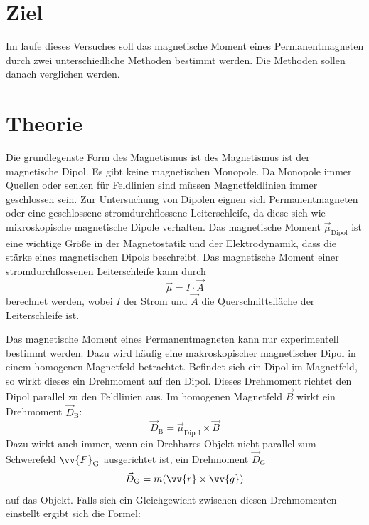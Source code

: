 \section{Ziel}
\label{sec:Ziel}
Im laufe dieses Versuches soll das magnetische Moment eines Permanentmagneten durch zwei unterschiedliche Methoden bestimmt werden. Die Methoden sollen danach verglichen werden.

\section{Theorie}
\label{sec:Theorie}
Die grundlegenste Form des Magnetismus ist des Magnetismus ist der magnetische Dipol. Es gibt keine magnetischen Monopole. Da Monopole immer Quellen oder senken für Feldlinien sind
müssen Magnetfeldlinien immer geschlossen sein. Zur Untersuchung von Dipolen eignen sich Permanentmagneten oder eine geschlossene stromdurchflossene Leiterschleife, da diese sich 
wie mikroskopische magnetische Dipole verhalten. Das magnetische Moment $\vec{\mu}_{\text{Dipol}}$ ist eine wichtige Größe in der Magnetostatik und der Elektrodynamik, dass die stärke eines 
magnetischen Dipols beschreibt. Das magnetische Moment einer stromdurchflossenen Leiterschleife kann durch 
\begin{equation}
\label{eqn:mu Leiterschleife}
    \vec{\mu} = I \cdot \vec{A}
\end{equation}
berechnet werden, wobei $I$ der Strom und $\vec{A}$ die Querschnittsfläche der Leiterschleife ist. 


Das magnetische Moment eines Permanentmagneten kann nur experimentell bestimmt
werden. Dazu wird häufig eine makroskopischer magnetischer Dipol in einem homogenen Magnetfeld betrachtet. Befindet sich ein Dipol im Magnetfeld, so wirkt dieses ein Drehmoment
auf den Dipol. Dieses Drehmoment richtet den Dipol parallel zu den Feldlinien aus. Im homogenen Magnetfeld $\vec{B}$ wirkt ein Drehmoment $\vec{D}_{\text{B}}$: 
\begin{equation}
    \label{eqn:Drehmoment B-Feld}
    \vec{D}_{\text{B}} = \vec{\mu}_{\text{Dipol}} \times \vec{B}
\end{equation}
Dazu wirkt auch immer, wenn ein Drehbares Objekt nicht parallel zum Schwerefeld $\vv{F}_{\text{G}}$ ausgerichtet ist, ein Drehmoment $\vec{D}_{\text{G}}$ 
\begin{equation}
    \label{eqn:Drehmoment Schwerefeld}
    \vec{D}_{\text{G}} = m(\vv{r} \times \vv{g})
\end{equation}
auf das Objekt. Falls sich ein Gleichgewicht zwischen diesen Drehmomenten einstellt ergibt sich die Formel:

